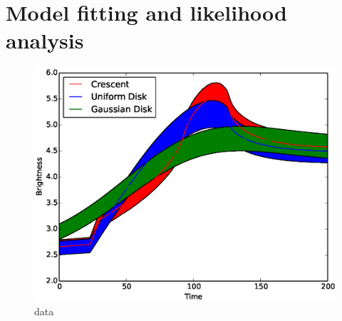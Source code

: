 \section{Model fitting and likelihood analysis}

\begin{figure}
\centering
\vskip-2in
\includegraphics[width=0.95\hsize]{plots/data_with_error.eps}
\vskip2in
\caption{\label{fig:datafitting} data}
\end{figure}


